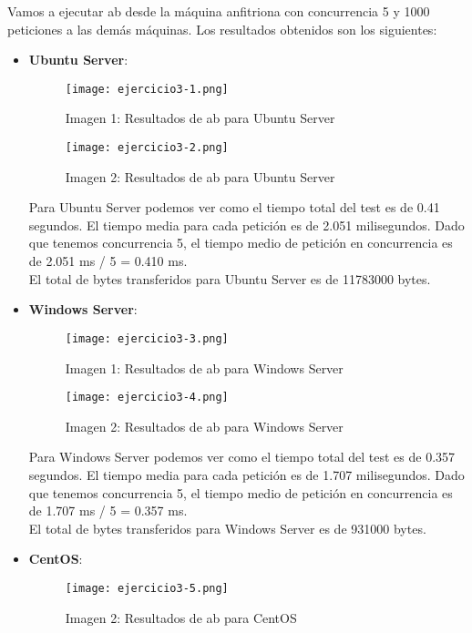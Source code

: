 	Vamos a ejecutar ab desde la máquina anfitriona con concurrencia 5 y 1000 peticiones a las demás máquinas. Los resultados obtenidos son los siguientes:
	\begin{itemize}
		\item \textbf{Ubuntu Server}:
			\begin{figure}[H] 
				\centering
				\texttt{[image: ejercicio3-1.png]} 
				\label{figura13} 
				\caption{Imagen 1: Resultados de ab para Ubuntu Server}
			\end{figure}
			
			\begin{figure}[H] 
				\centering
				\texttt{[image: ejercicio3-2.png]} 
				\label{figura14} 
				\caption{Imagen 2: Resultados de ab para Ubuntu Server}
			\end{figure}
			
			Para Ubuntu Server podemos ver como el tiempo total del test es de 0.41 segundos. El tiempo media para cada petición es de 2.051 milisegundos. Dado que tenemos concurrencia 5, el tiempo medio de petición en concurrencia es de 2.051 ms / 5 = 0.410 ms.\\
			El total de bytes transferidos para Ubuntu Server es de 11783000 bytes.
		\item \textbf{Windows Server}:
			\begin{figure}[H] 
				\centering
				\texttt{[image: ejercicio3-3.png]} 
				\label{figura15} 
				\caption{Imagen 1: Resultados de ab para Windows Server}
			\end{figure}
			
			\begin{figure}[H] 
				\centering
				\texttt{[image: ejercicio3-4.png]} 
				\label{figura16} 
				\caption{Imagen 2: Resultados de ab para Windows Server}
			\end{figure}
			
			Para Windows Server podemos ver como el tiempo total del test es de 0.357 segundos. El tiempo media para cada petición es de 1.707 milisegundos. Dado que tenemos concurrencia 5, el tiempo medio de petición en concurrencia es de 1.707 ms / 5 = 0.357 ms.\\
			El total de bytes transferidos para Windows Server es de 931000 bytes.
			
		\item \textbf{CentOS}:
			\begin{figure}[H] 
				\centering
				\texttt{[image: ejercicio3-5.png]} 
				\label{figura17} 
				\caption{Imagen 2: Resultados de ab para CentOS}
			\end{figure}
			

\end{itemize}
